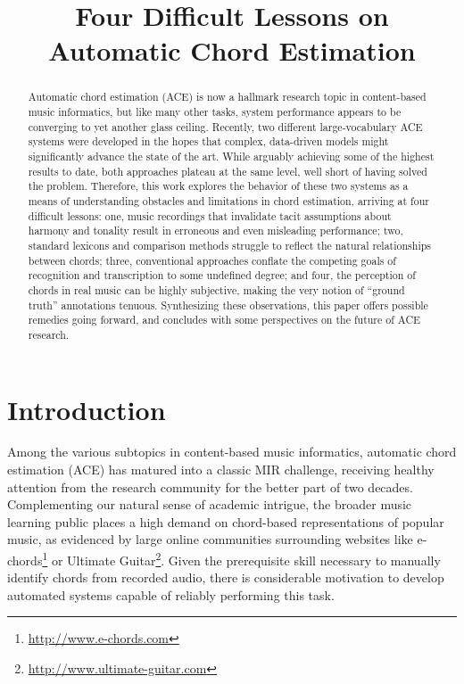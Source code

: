 \documentclass{article}
\title{Four Difficult Lessons on Automatic Chord Estimation}
\begin{document}
%
\maketitle
%
\begin{abstract}

Automatic chord estimation (ACE) is now a hallmark research topic in content-based music informatics, but like many other tasks, system performance appears to be converging to yet another glass ceiling.
Recently, two different large-vocabulary ACE systems were developed in the hopes that complex, data-driven models might significantly advance the state of the art.
While arguably achieving some of the highest results to date, both approaches plateau at the same level, well short of having solved the problem.
Therefore, this work explores the behavior of these two systems as a means of understanding obstacles and limitations in chord estimation, arriving at four difficult lessons:
one, music recordings that invalidate tacit assumptions about harmony and tonality result in erroneous and even misleading performance;
two, standard lexicons and comparison methods struggle to reflect the natural relationships between chords;
three, conventional approaches conflate the competing goals of recognition and transcription to some undefined degree;
and four, the perception of chords in real music can be highly subjective, making the very notion of ``ground truth'' annotations tenuous.
Synthesizing these observations, this paper offers possible remedies going forward, and concludes with some perspectives on the future of ACE research.

\end{abstract}


\section{Introduction}
\label{sec:introduction}

Among the various subtopics in content-based music informatics, automatic chord estimation (ACE) has matured into a classic MIR challenge, receiving healthy attention from the research community for the better part of two decades.
Complementing our natural sense of academic intrigue, the broader music learning public places a high demand on chord-based representations of popular music, as evidenced by large online communities surrounding websites like e-chords\footnote{\url{http://www.e-chords.com}} or Ultimate Guitar\footnote{\url{http://www.ultimate-guitar.com}}.
Given the prerequisite skill necessary to manually identify chords from recorded audio, there is considerable motivation to develop automated systems capable of reliably performing this task.
\end{document}
